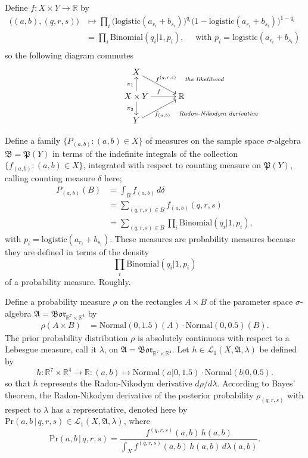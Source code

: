 \documentclass[
twoside=true,
paper=letter,
fontsize=11pt,
pagesize=auto,
leqno,
openany,
headsepline,
overfullrule,
]{scrbook}
\theoremstyle{plain}
\theoremstyle{plain}
\theoremstyle{definition}
\theoremstyle{bfnoteitalic}
\theoremstyle{bfnoteroman}
\newcommand{\sigalg}[1]{\mathfrak{#1}}
\newcommand{\cali}[1]{\mathscr{#1}}
\newcommand{\borel}{\mathfrak{Bor}}
\newcommand{\textsigma}{\hbox{\large{$\sigma$}}\kern-1pt}
\newcommand{\R}{\mathbb{R}}
\newcommand{\powerset}{\mathfrak{P}}
\newcommand{\function}{f}
\newcommand{\functioniii}{h}
\newcommand{\measurespace}{X}
\newcommand{\measurespaceii}{Y}
\newcommand{\seti}{A}
\newcommand{\setii}{B}
\newcommand{\projectionone}{\pi_1}
\newcommand{\projectiontwo}{\pi_2}
\newcommand{\pspace}{\measurespace}%
\newcommand{\sspace}{\measurespaceii}%
\newcommand{\sspacesig}{\sigalg{B}}
\newcommand{\pspacesig}{\sigalg{A}}
\begin{document}
Define $\function:\pspace\times\sspace \to \R$ by 
\begin{align*}
\bigl((a,b),(q,r,s)\bigr)
& \mapsto
\prod_i
\bigl( \text{logistic}(a_{r_i} + b_{s_i}) \bigr)^{q_i}
\bigl( 1 - \text{logistic}(a_{r_i} + b_{s_i}) \bigr)^{1-q_i} \\
& = \prod_i
\text{Binomial}(q_i \vert 1, p_i),\quad \text{ with $p_i = \text{logistic}(a_{r_i} + b_{s_i})$} \\
\end{align*}
so the following diagram commutes
\[
\xymatrix@R=16pt@C=30pt{ 
\pspace \ar[dr]^{\ \function^{(q,r,s)}\quad \rlap{\emph{\scriptsize the likelihood}}}
& \\
\pspace\times\sspace 
\ar[u]^{\projectionone}
\ar[d]_{\projectiontwo}
\ar[r]^{\function}
& \R \\
\sspace 
\ar[ur]_{\function_{(a,b)} \quad \rlap{\emph{\scriptsize Radon-Nikodym derivative}}} 
& 
}
\]

Define a family $\{P_{(a,b)}:(a,b)\in\pspace\}$ of measures on the sample space \textsigma-algebra
$\sspacesig=\powerset(\sspace)$ in terms of the indefinite integrals of the collection
$\{ \function_{(a,b)} : (a,b)\in\pspace \}$, integrated with respect to counting measure on 
$\powerset(\sspace)$, calling counting measure $\delta$ here;
\begin{align*}
P_{(a,b)}(\setii)
& = \int_\setii \function_{(a,b)} \,d\delta \\
& = \sum_{(q,r,s)\in\setii} \function_{(a,b)}(q,r,s) \\
& = \sum_{(q,r,s)\in\setii} \prod_i \text{Binomial}(q_i\vert 1,p_i),
\end{align*}
with $p_i=\text{logistic}(a_{r_i} + b_{s_i})$.
These measures are probability measures because they are defined in terms of the density 
\[
\prod_i \text{Binomial}(q_i\vert 1,p_i)
\]
of a probability measure. Roughly.

Define a probability measure $\rho$ on the rectangles 
$\seti\times\setii$ of the parameter space \textsigma-algebra 
$\pspacesig=\borel_{\R^7\times\R^4}$ by
\begin{align*}
\rho(\seti\times\setii)
&=
\text{Normal}(0,1.5)(\seti)\cdot
\text{Normal}(0,0.5)(\setii).
\end{align*}
The prior probability distribution $\rho$ is absolutely continuous with respect to a Lebesgue measure, call it
$\lambda$, on $\pspacesig=\borel_{\R^7\times\R^4}$.
Let $\functioniii\in\cali{L}_1(\pspace,\pspacesig,\lambda)$ be defined by
\[
\functioniii:\R^7\times\R^4\to\R:(a,b)\mapsto
\text{Normal}(a\vert 0,1.5)\cdot
\text{Normal}(b\vert 0,0.5).
\]
so that $\functioniii$ represents the Radon-Nikodym derivative $d\rho/d\lambda$.
According to Bayes' theorem, the Radon-Nikodym derivative of the posterior probability 
$\rho_{(q,r,s)}$ with respect to $\lambda$ has a representative, denoted here by 
$\text{Pr}(a,b\,\vert\, q,r,s)\in\cali{L}_1(\pspace, \pspacesig,\lambda)$,
where
\[
\text{Pr}(a,b\,\vert\, q,r,s)
=
\frac{\function^{(q,r,s)}(a,b)\,\functioniii(a,b)}
{\int_{\pspace}\function^{(q,r,s)}(a,b)\,\functioniii(a,b)\,d\lambda(a,b)}.
\]
\end{document}
